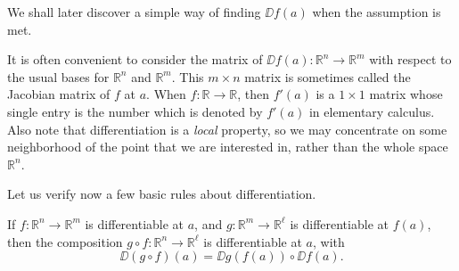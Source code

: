 \documentclass[11pt]{article}
\begin{document}
We shall later discover a simple way of finding $\DD f(a)$ when the
assumption is met.

It is often convenient to consider the matrix of $\DD f(a) : \mathbb{R}^n
\rightarrow \mathbb{R}^m$ with respect to the usual bases for $\mathbb{R}^n$ and $\mathbb{R}^m$.  
This $m \times n$ matrix is sometimes called the \textsf{Jacobian matrix} of $f$ at $a$.  
When $f : \mathbb{R} \rightarrow \mathbb{R}$, then
$f'(a)$ is a $1 \times 1$ matrix whose single entry  is the number
which is denoted by $f'(a)$ in elementary calculus.  Also note that
differentiation is a \textit{local} property, so we may concentrate on
some neighborhood of the point that we are interested in, rather than
the whole space $\mathbb{R}^n$.

Let us verify now a few basic rules about differentiation.

\begin{thm} \label{thm:chainrule}
  If $f : \mathbb{R}^n \rightarrow \mathbb{R}^m$ is differentiable at $a$, and $g : \mathbb{R}^m \rightarrow \mathbb{R}^\ell$ is differentiable at $f(a)$, then the composition $g \circ f : \mathbb{R}^n \rightarrow \mathbb{R}^\ell$ is differentiable at $a$, with
  \begin{equation*}
    \DD (g \circ f)(a) = \DD g(f(a)) \circ \DD f(a).
  \end{equation*}
\end{thm}
\end{document}
